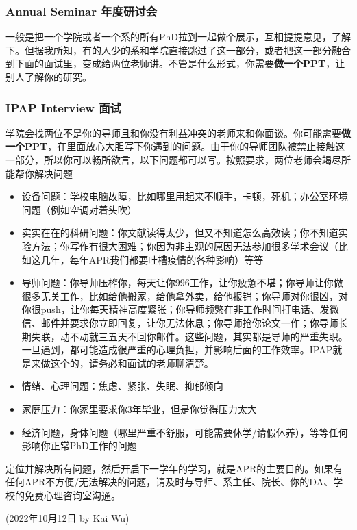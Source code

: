 \subsubsection{Annual Seminar 年度研讨会}
一般是把一个学院或者一个系的所有PhD拉到一起做个展示，互相提提意见，了解下。但据我所知，有的人少的系和学院直接跳过了这一部分，或者把这一部分融合到下面的面试里，变成给两位老师讲。不管是什么形式，你需要\textbf{做一个PPT}，让别人了解你的研究。
\subsubsection{IPAP Interview 面试}
学院会找两位不是你的导师且和你没有利益冲突的老师来和你面谈。你可能需要\textbf{做一个PPT}，在里面放心大胆写下你遇到的问题。由于你的导师团队被禁止接触这一部分，所以你可以畅所欲言，以下问题都可以写。按照要求，两位老师会竭尽所能帮你解决问题
\begin{itemize}
    \item 设备问题：学校电脑故障，比如哪里用起来不顺手，卡顿，死机；办公室环境问题（例如空调对着头吹）
    \item 实实在在的科研问题：你文献读得太少，但又不知道怎么高效读；你不知道实验方法；你写作有很大困难；你因为非主观的原因无法参加很多学术会议（比如这几年，每年APR我们都要吐槽疫情的各种影响）等等
    \item 导师问题：你导师压榨你，每天让你996工作，让你疲惫不堪；你导师让你做很多无关工作，比如给他搬家，给他拿外卖，给他报销；你导师对你很凶，对你很push，让你每天精神高度紧张；你导师频繁在非工作时间打电话、发微信、邮件并要求你立即回复，让你无法休息；你导师抢你论文一作；你导师长期失联，动不动就三五天不回你邮件。这些问题，其实都是导师的严重失职。一旦遇到，都可能造成很严重的心理负担，并影响后面的工作效率。IPAP就是来做这个的，请务必和面试的老师聊清楚。
    \item 情绪、心理问题：焦虑、紧张、失眠、抑郁倾向
    \item 家庭压力：你家里要求你3年毕业，但是你觉得压力太大
    \item 经济问题，身体问题（哪里严重不舒服，可能需要休学/请假休养），等等任何影响你正常PhD工作的问题
\end{itemize}

\vspace{5mm}
定位并解决所有问题，然后开启下一学年的学习，就是APR的主要目的。如果有任何APR不方便/无法解决的问题，请及时与导师、系主任、院长、你的DA、学校的免费心理咨询室沟通。


\begin{flushright}
(2022年10月12日 by Kai Wu)
\end{flushright}